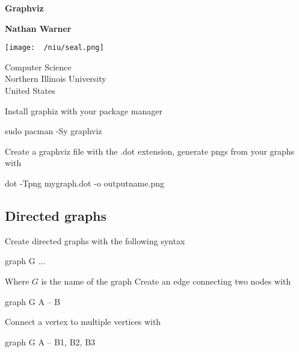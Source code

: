 \documentclass{report}
\title{\Huge{}}
\author{\huge{Nathan Warner}}
\date{\huge{}}
\begin{document}
        \begin{titlepage}
       \begin{center}
           \vspace*{1cm}
    
           \textbf{Graphviz}
    
           \vspace{0.5cm}
            
                
           \vspace{1.5cm}
    
           \textbf{Nathan Warner}
    
           \vfill
                
                
           \vspace{0.8cm}
         
           \texttt{[image: ~/niu/seal.png]}
                
           Computer Science \\
           Northern Illinois University\\
           United States\\
           
                
       \end{center}
    \end{titlepage}
    \tableofcontents
    \pagebreak 
    \bigbreak \noindent 
    Install graphiz with your package manager
    \bigbreak \noindent 
    \begin{bashcode}
    sudo pacman -Sy graphviz
    \end{bashcode}
    \bigbreak \noindent 
    Create a graphviz file with the .dot extension, generate pngs from your graphs with
    \bigbreak \noindent 
    \begin{bashcode}
    dot -Tpng mygraph.dot -o outputname.png
    \end{bashcode}

    \pagebreak 
    \bigbreak \noindent 
    \subsection{Directed graphs}
    \bigbreak \noindent 
    Create directed graphs with the following syntax
    \bigbreak \noindent 
    \begin{cppcode}
        graph G {
            ...
        }
    \end{cppcode}
    \bigbreak \noindent 
    Where $G$ is the name of the graph
    \bigbreak \noindent 
    Create an edge connecting two nodes with
    \bigbreak \noindent 
    \begin{cppcode}
        graph G {
            A -- B
        }
    \end{cppcode}
    \bigbreak \noindent 
    Connect a vertex to multiple vertices with
    \bigbreak \noindent 
    \begin{cppcode}
        graph G {
            A -- {B1, B2, B3}
        }
    \end{cppcode}
\end{document}
